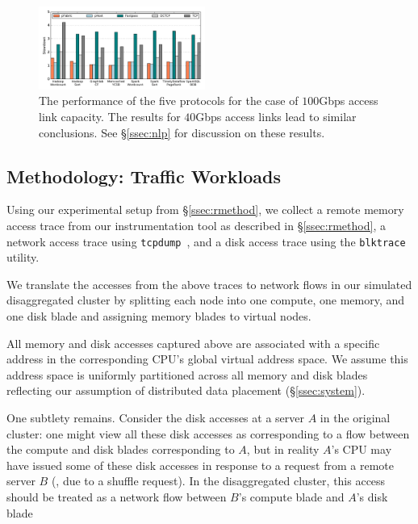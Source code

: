 %
%
\begin{figure}[t]
  \centering
      \includegraphics[width = 0.485\textwidth]{img/slowdowns/100g/allFlows_rack-scale_slowdowns} 
  \caption{\small{The performance of the five protocols for the case of $100$Gbps access link capacity. The results for $40$Gbps access links lead to similar conclusions. See \S\ref{ssec:nlp} for discussion on these results.}}
  \label{fig:phostp}
\end{figure}
%
\subsection{Methodology: \dis Traffic Workloads}
\label{ssec:ssmethod-traffic}
Using our experimental setup from \S\ref{ssec:rmethod}, we collect a remote memory access trace from our instrumentation tool as described in \S\ref{ssec:rmethod}, a network access trace using {\tt tcpdump}~\cite{tcpdump}, and a disk access trace using the {\tt blktrace} utility.

We translate the accesses from the above traces to network flows 
in our simulated disaggregated cluster by splitting each node into one compute, one memory, and one disk blade and assigning memory blades to virtual nodes.

All memory and disk accesses captured above are associated with a specific address in the corresponding CPU's global virtual address space. We assume this address space is uniformly partitioned across all memory and disk blades reflecting our assumption of distributed data placement (\S\ref{ssec:system}).  

One subtlety remains. Consider the disk accesses at a server $A$ in the original cluster: one might view all these disk accesses as corresponding to a flow between the compute  and disk blades corresponding to $A$, but in reality $A$'s CPU may have issued some of these disk accesses in response to a request from a remote server $B$ (\eg, due to a shuffle request). 
In the disaggregated cluster, this access should be treated as a network flow between \emph{$B$}'s compute blade and $A$'s disk blade %

